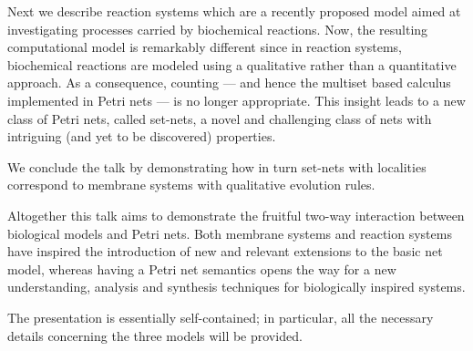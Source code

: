 \documentclass{mecbic}
\begin{document}
Next we describe reaction systems which are 
a recently proposed model aimed at
investigating processes carried by biochemical reactions. Now, the resulting
computational model is remarkably different since in
reaction systems, biochemical reactions are modeled using a qualitative
rather than a quantitative approach.
As a consequence, counting  --- and hence the
multiset based calculus implemented in Petri nets ---
is no longer appropriate.
This insight leads to a new class of Petri nets, called set-nets, a novel and challenging
class of nets with intriguing (and yet to be discovered) properties.

We conclude the talk by demonstrating how in turn set-nets with localities
correspond to membrane systems with qualitative evolution 
rules.  

Altogether this talk aims to demonstrate the fruitful two-way
interaction between biological models and Petri nets.
Both membrane systems and reaction systems have inspired the introduction of 
new and relevant extensions to the basic net model, whereas having a Petri net
semantics opens the way for a new understanding, analysis and synthesis
techniques for biologically inspired systems.

The presentation is essentially self-contained; in  particular, all the
necessary details concerning   
the three models will be provided.
\end{document}
